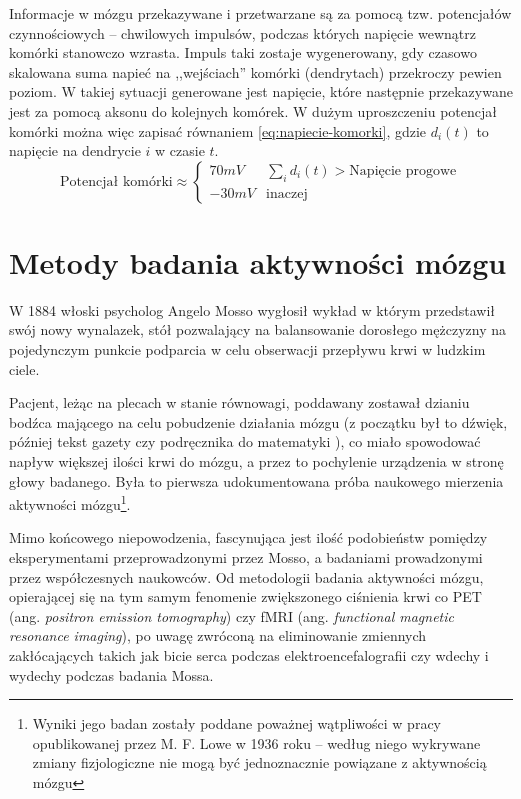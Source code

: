 \documentclass{./assets/wfis}
\begin{document}
Informacje w mózgu przekazywane i przetwarzane są za pomocą tzw. potencjałów czynnościowych – chwilowych impulsów, podczas których napięcie wewnątrz komórki stanowczo wzrasta. Impuls taki zostaje wygenerowany, gdy czasowo skalowana suma napieć na ,,wejściach'' komórki (dendrytach) przekroczy pewien poziom. W takiej sytuacji generowane jest napięcie, które następnie przekazywane jest za pomocą aksonu do kolejnych komórek. W dużym uproszczeniu potencjał komórki można więc zapisać równaniem \ref{eq:napiecie-komorki}, gdzie $d_i(t)$ to napięcie na dendrycie $i$ w czasie $t$.
\begin{equation}\label{eq:napiecie-komorki}
    \text{Potencjał komórki} \approx 
    \begin{cases} 
      70mV & \sum_i d_i(t) > \text{Napięcie progowe}  \\
      -30mV &  \text{inaczej}
   \end{cases}
\end{equation}


\section{Metody badania aktywności mózgu}
W 1884 włoski psycholog Angelo Mosso wygłosił wykład \cite{sandrone_weighing_2014} w którym przedstawił swój nowy wynalazek, stół pozwalający na balansowanie dorosłego mężczyzny na pojedynczym punkcie podparcia w celu obserwacji przepływu krwi w ludzkim ciele. 

Pacjent, leżąc na plecach w stanie równowagi, poddawany zostawał dzianiu bodźca mającego na celu pobudzenie działania mózgu (z początku był to dźwięk, później tekst gazety czy podręcznika do matematyki \cite{sandrone_weighing_2014}), co miało spowodować napływ większej ilości krwi do mózgu, a przez to pochylenie urządzenia w stronę głowy badanego. Była to pierwsza udokumentowana próba naukowego mierzenia aktywności mózgu\footnote{Wyniki jego badan zostały poddane poważnej wątpliwości w pracy opublikowanej przez M. F. Lowe \cite{lowe_application_1936} w 1936 roku – według niego wykrywane zmiany fizjologiczne nie mogą być jednoznacznie powiązane z aktywnością mózgu}.

Mimo końcowego niepowodzenia, fascynująca jest ilość podobieństw pomiędzy eksperymentami przeprowadzonymi przez Mosso, a badaniami prowadzonymi przez współczesnych naukowców. Od metodologii badania aktywności mózgu, opierającej się na tym samym fenomenie zwiększonego ciśnienia krwi co PET (ang. \textit{positron emission tomography}) czy fMRI (ang. \textit{functional magnetic resonance imaging}), po uwagę zwróconą na eliminowanie zmiennych zakłócających takich jak bicie serca podczas elektroencefalografii czy wdechy i wydechy podczas badania Mossa.
\end{document}
